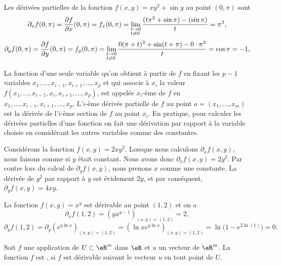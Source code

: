 \begin{example}
Les dérivées partielles de la fonction $f(x,y)=xy^3+\sin y$ au point $(0,\pi)$ sont 
\[
\partial_xf(0,\pi)=\frac{ \partial f }{ \partial x }(0,\pi)=f_x(0,\pi)=\lim_{\begin{subarray}{l}
    t\to 0\\ t\neq 0 
  \end{subarray}} \frac{(t\pi^3+\sin \pi)-(\sin \pi)}{t}= \pi^3,
\] 
\[
\partial_yf(0,\pi)=\frac{ \partial f }{ \partial y }(0,\pi)=f_y(0,\pi)=\lim_{\begin{subarray}{l}
    t\to 0\\ t\neq 0 
  \end{subarray}} \frac{0(\pi+t)^3+\sin (t+\pi)-0\cdot \pi^3}{t}= \cos \pi=-1,
\]   
\end{example}
La fonction d'une seule variable qu'on obtient à partir de $f$ en fixant les $p-1$ variables  $x_1,\ldots, x_{i-1}, x_{i+1}, \ldots, x_p$ et qui associe à $x_i$ la valeur $f(x_1,\ldots, x_{i-1}, x_i, x_{i+1}, \ldots, x_p)$, est appelée $x_i$-ème  de $f$ en $x_1,\ldots, x_{i-1}, x_{i+1}, \ldots, x_p$. L'$i$-ème dérivée partielle de $f$ au point $a=(x_1,\ldots,x_m)$ est la dérivée de l'$i$-ème section de $f$ au point $x_i$. En pratique, pour calculer les dérivées partielles d'une fonction on fait une dérivation par rapport à la variable choisie en considérant les  autres variables comme des constantes.

\begin{example}
	Considérons la fonction $f(x,y)=2xy^2$. Lorsque nous calculons $\partial_xf(x,y)$, nous faisons comme si $y$ était constant. Nous avons donc $\partial_xf(x,y)=2y^2$. Par contre lors du calcul de $\partial_yf(x,y)$, nous prenons $x$ comme une constante. La dérivée de $y^2$ par rapport à $y$ est évidement $2y$, et par conséquent, $\partial_yf(x,y)=4xy$.
\end{example}

\begin{example}
  La fonction $f(x,y)=x^y$ est dérivable au point $(1,2)$ et on a
\[
\partial_x f(1,2)=(yx^{y-1})_{(x,y)=(1,2)}=2,
\]
\[
\partial_y f(1,2)=\partial_y\left(e^{y\ln x}\right)_{(x,y)=(1,2)}=\left(\ln x e^{y\ln x}\right)_{(x,y)=(1,2)}=\ln\big( 1- e^{2\ln(1)} \big)=0.
\]
\end{example}
\begin{definition}
  Soit $f$ une application de $U\subset\eR^m$ dans $\eR$ et $u$ un vecteur de $\eR^m$. La fonction $f$ est , si $f$ est dérivable  suivant le vecteur $u$ en tout point de $U$.
\end{definition} 

